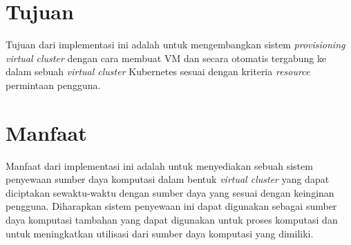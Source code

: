 \section{Tujuan}
\label{sec:Tujuan}

Tujuan dari implementasi ini adalah untuk mengembangkan sistem \emph{provisioning virtual cluster}
dengan cara membuat VM dan secara otomatis tergabung ke dalam sebuah \emph{virtual cluster}
Kubernetes sesuai dengan kriteria \emph{resource} permintaan pengguna.

\section{Manfaat}
\label{sec:sistematikapenulisan}

Manfaat dari implementasi ini adalah untuk menyediakan sebuah sistem penyewaan
sumber daya komputasi dalam bentuk \emph{virtual cluster} yang dapat
diciptakan sewaktu-waktu dengan sumber daya yang sesuai dengan keinginan pengguna.
Diharapkan sistem penyewaan ini dapat digunakan sebagai sumber daya komputasi
tambahan yang dapat digunakan untuk proses komputasi dan untuk
meningkatkan utilisasi dari sumber daya komputasi yang dimiliki.
